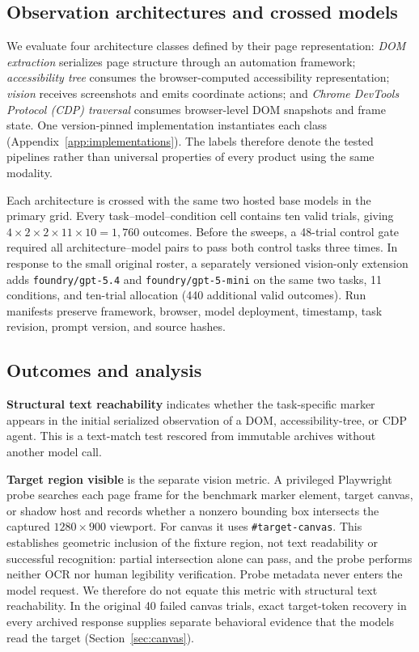 \documentclass{article}
\begin{document}
\subsection{Observation architectures and crossed models}

We evaluate four architecture classes defined by their page representation: \emph{DOM extraction} serializes page structure through an automation framework; \emph{accessibility tree} consumes the browser-computed accessibility representation; \emph{vision} receives screenshots and emits coordinate actions; and \emph{Chrome DevTools Protocol (CDP) traversal} consumes browser-level DOM snapshots and frame state. One version-pinned implementation instantiates each class (Appendix~\ref{app:implementations}). The labels therefore denote the tested pipelines rather than universal properties of every product using the same modality.

Each architecture is crossed with the same two hosted base models in the primary grid. Every task--model--condition cell contains ten valid trials, giving $4\times2\times2\times11\times10=1{,}760$ outcomes. Before the sweeps, a 48-trial control gate required all architecture--model pairs to pass both control tasks three times. In response to the small original roster, a separately versioned vision-only extension adds \texttt{foundry/gpt-5.4} and \texttt{foundry/gpt-5-mini} on the same two tasks, 11 conditions, and ten-trial allocation (440 additional valid outcomes). Run manifests preserve framework, browser, model deployment, timestamp, task revision, prompt version, and source hashes.

\subsection{Outcomes and analysis}

\textbf{Structural text reachability} indicates whether the task-specific marker appears in the initial serialized observation of a DOM, accessibility-tree, or CDP agent. This is a text-match test rescored from immutable archives without another model call.

\textbf{Target region visible} is the separate vision metric. A privileged Playwright probe searches each page frame for the benchmark marker element, target canvas, or shadow host and records whether a nonzero bounding box intersects the captured $1280\times900$ viewport. For canvas it uses \texttt{\#target-canvas}. This establishes geometric inclusion of the fixture region, not text readability or successful recognition: partial intersection alone can pass, and the probe performs neither OCR nor human legibility verification. Probe metadata never enters the model request. We therefore do not equate this metric with structural text reachability. In the original 40 failed canvas trials, exact target-token recovery in every archived response supplies separate behavioral evidence that the models read the target (Section~\ref{sec:canvas}).
\end{document}
